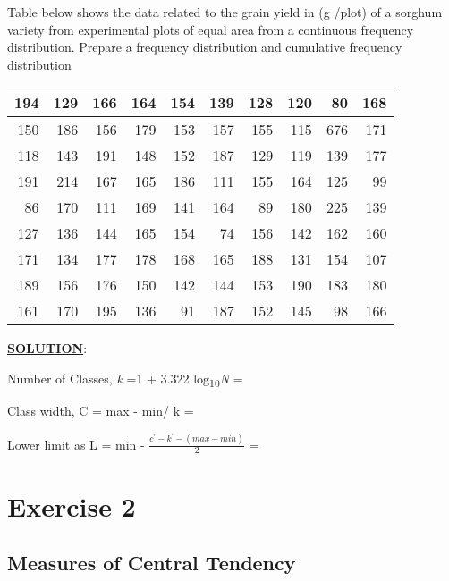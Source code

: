 \documentclass[
]{book}
\begin{document}
Table below shows the data related to the grain yield in (g /plot) of a sorghum variety from experimental plots of equal area from a continuous frequency distribution. Prepare a frequency distribution and cumulative frequency distribution

\begin{table}[H]
\centering
\begin{tabular}{r|r|r|r|r|r|r|r|r|r}
\hline
194 & 129 & 166 & 164 & 154 & 139 & 128 & 120 & 80 & 168\\
\hline
150 & 186 & 156 & 179 & 153 & 157 & 155 & 115 & 676 & 171\\
\hline
118 & 143 & 191 & 148 & 152 & 187 & 129 & 119 & 139 & 177\\
\hline
191 & 214 & 167 & 165 & 186 & 111 & 155 & 164 & 125 & 99\\
\hline
86 & 170 & 111 & 169 & 141 & 164 & 89 & 180 & 225 & 139\\
\hline
127 & 136 & 144 & 165 & 154 & 74 & 156 & 142 & 162 & 160\\
\hline
171 & 134 & 177 & 178 & 168 & 165 & 188 & 131 & 154 & 107\\
\hline
189 & 156 & 176 & 150 & 142 & 144 & 153 & 190 & 183 & 180\\
\hline
161 & 170 & 195 & 136 & 91 & 187 & 152 & 145 & 98 & 166\\
\hline
\end{tabular}
\end{table}

\underline{\textbf{SOLUTION}}:

Number of Classes, \emph{k} =1 + 3.322 log\textsubscript{10}\emph{N} =

Class width, C = \textbar{} max - min\textbar/ k =

Lower limit as L = min - \(\frac{c^{'} - k^{'} - (max - min)}{2}\) =

\hypertarget{exercise-2}{%
\chapter{Exercise 2}\label{exercise-2}}

\hypertarget{measures-of-central-tendency}{%
\section{Measures of Central Tendency}\label{measures-of-central-tendency}}
\end{document}
